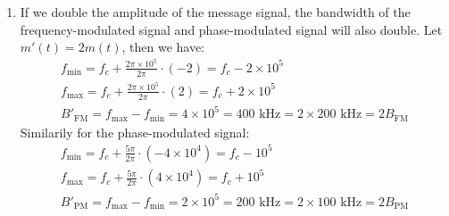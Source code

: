 \documentclass{article}
\begin{document}
\begin{enumerate}[label=3.\arabic*]
    \item If we double the amplitude of the message signal, the bandwidth of the frequency-modulated signal and phase-modulated signal will also double. Let $m'(t) = 2m(t)$, then we have:
    \begin{align*}
        f_{\text{min}} = f_c + \frac{2\pi \times 10^5}{2\pi} \cdot (-2) = f_c - 2 \times 10^5 \\
        f_{\text{max}} = f_c + \frac{2\pi \times 10^5}{2\pi} \cdot (2) = f_c + 2 \times 10^5 \\
        B'_{\text{FM}} = f_{\text{max}} - f_{\text{min}} = 4\times10^5 = 400 \text{ kHz} = 2 \times 200 \text{ kHz} = 2B_{\text{FM}}
    \end{align*}
    Similarily for the phase-modulated signal:
    \begin{align*}
        f_{\text{min}} = f_c + \frac{5\pi}{2\pi} \cdot (-4\times10^4) = f_c - 10^5 \\
        f_{\text{max}} = f_c + \frac{5\pi}{2\pi} \cdot (4\times10^4) = f_c + 10^5 \\
        B'_{\text{PM}} = f_{\text{max}} - f_{\text{min}} = 2\times10^5 = 200 \text{ kHz} = 2 \times 100 \text{ kHz} = 2B_{\text{PM}}
    \end{align*}
\end{enumerate}


\end{document}
